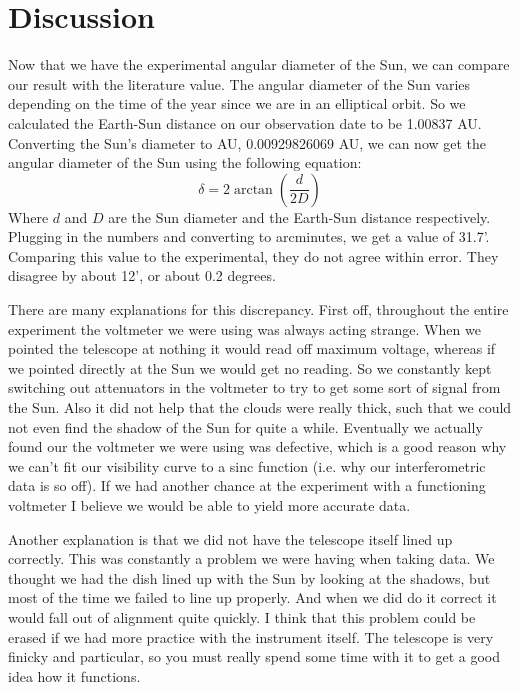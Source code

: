 \documentclass{aastex61}
\begin{document}
\section{Discussion}
Now that we have the experimental angular diameter of the Sun, we can compare our result with the literature value. The angular diameter of the Sun varies depending on the time of the year since we are in an elliptical orbit. So we calculated the Earth-Sun distance on our observation date to be 1.00837 AU. Converting the Sun's diameter to AU, 0.00929826069 AU, we can now get the angular diameter of the Sun using the following equation:
\begin{equation}
	\delta = 2 \arctan\left( \frac{d}{2D}\right) 
\end{equation}
Where $d$ and $D$ are the Sun diameter and the Earth-Sun distance respectively. Plugging in the numbers and converting to arcminutes, we get a value of 31.7'. Comparing this value to the experimental, they do not agree within error. They disagree by about 12', or about 0.2 degrees. 

There are many explanations for this discrepancy. First off, throughout the entire experiment the voltmeter we were using was always acting strange. When we pointed the telescope at nothing it would read off maximum voltage, whereas if we pointed directly at the Sun we would get no reading. So we constantly kept switching out attenuators in the voltmeter to try to get some sort of signal from the Sun. Also it did not help that the clouds were really thick, such that we could not even find the shadow of the Sun for quite a while. Eventually we actually found our the voltmeter we were using was defective, which is a good reason why we can't fit our visibility curve to a sinc function (i.e. why our interferometric data is so off). If we had another chance at the experiment with a functioning voltmeter I believe we would be able to yield more accurate data.

Another explanation is that we did not have the telescope itself lined up correctly. This was constantly a problem we were having when taking data. We thought we had the dish lined up with the Sun by looking at the shadows, but most of the time we failed to line up properly. And when we did do it correct it would fall out of alignment quite quickly. I think that this problem could be erased if we had more practice with the instrument itself. The telescope is very finicky and particular, so you must really spend some time with it to get a good idea how it functions.
\end{document}
